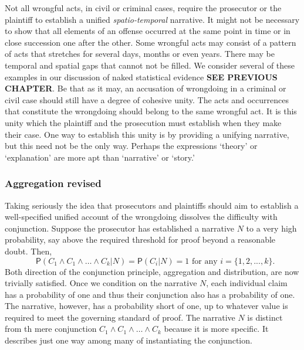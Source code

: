 \documentclass[
  10pt,
  dvipsnames,enabledeprecatedfontcommands]{scrartcl}
\newcommand{\pr}[1]{\mathsf{P}(#1)}
\begin{document}
Not all wrongful acts, in civil or criminal cases, require the
prosecutor or the plaintiff to establish a unified
\emph{spatio-temporal} narrative. It might not be necessary to show that
all elements of an offense occurred at the same point in time or in
close succession one after the other. Some wrongful acts may consist of
a pattern of acts that stretches for several days, months or even years.
There may be temporal and spatial gaps that cannot not be filled. We
consider several of these examples in our discussion of naked
statistical evidence \textbf{SEE PREVIOUS CHAPTER}. Be that as it may,
an accusation of wrongdoing in a criminal or civil case should still
have a degree of cohesive unity. The acts and occurrences that
constitute the wrongdoing should belong to the same wrongful act. It is
this unity which the plaintiff and the prosecution must establish when
they make their case. One way to establish this unity is by providing a
unifying narrative, but this need not be the only way. Perhaps the
expressions `theory' or `explanation' are more apt than `narrative' or
`story.'

\hypertarget{aggregation-revised}{%
\subsubsection{Aggregation revised}\label{aggregation-revised}}

Taking seriously the idea that prosecutors and plaintiffs should aim to
establish a well-specified unified account of the wrongdoing dissolves
the difficulty with conjunction. Suppose the prosecutor has established
a narrative \(N\) to a very high probability, say above the required
threshold for proof beyond a reasonable doubt. Then,
\[\text{ $\pr{C_1\wedge C_1 \wedge \dots \wedge C_k \vert N}=\pr{C_i \vert N} = 1$ for any $i=\{1, 2, ..., k\}$}.\]
\noindent Both direction of the conjunction principle, aggregation and
distribution, are now trivially satisfied. Once we condition on the
narrative \(N\), each individual claim has a probability of one and thus
their conjunction also has a probability of one. The narrative, however,
has a probability short of one, up to whatever value is required to meet
the governing standard of proof. The narrative \(N\) is distinct from th
mere conjunction \(C_1\wedge C_1 \wedge \dots \wedge C_k\) because it is
more specific. It describes just one way among many of instantiating the
conjunction.
\end{document}
